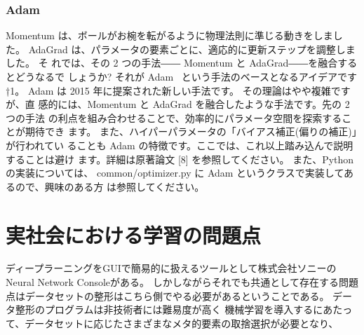 \subsubsection{Adam}
Momentum は、ボールがお椀を転がるように物理法則に準じる動きをしました。 
AdaGrad は、パラメータの要素ごとに、適応的に更新ステップを調整しました。
そ れでは、その 2 つの手法―― Momentum と AdaGrad――を融合するとどうなるで しょうか? 
それが Adam~\cite{adam} という手法のベースとなるアイデアです†1。
Adam は 2015 年に提案された新しい手法です。
その理論はやや複雑ですが、直 感的には、Momentum と AdaGrad を融合したような手法です。先の 2 つの手法 の利点を組み合わせることで、効率的にパラメータ空間を探索することが期待でき ます。
また、ハイパーパラメータの「バイアス補正(偏りの補正)」が行われてい ることも Adam の特徴です。ここでは、これ以上踏み込んで説明することは避け ます。詳細は原著論文 [8] を参照してください。
また、Python の実装については、 common/optimizer.py に Adam というクラスで実装してあるので、興味のある方 は参照してください。


\section{実社会における学習の問題点}
ディープラーニングをGUIで簡易的に扱えるツールとして株式会社ソニーのNeural Network Consoleがある。
しかしながらそれでも共通として存在する問題点はデータセットの整形はこちら側でやる必要があるということである。
データ整形のプログラムは非技術者には難易度が高く
機械学習を導入するにあたって、データセットに応じたさまざまなメタ的要素の取捨選択が必要となり、
